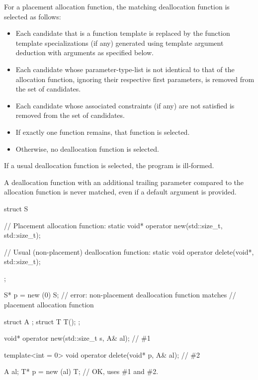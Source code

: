 \pnum
For a placement allocation function,
the matching deallocation function is selected as follows:
\begin{itemize}
\item
Each candidate that is a function template is replaced by
the function template specializations (if any)
generated using template argument deduction
with arguments as specified below.
\item
Each candidate whose parameter-type-list is not identical to
that of the allocation function,
ignoring their respective first parameters,
is removed from the set of candidates.
\item
Each candidate whose associated constraints (if any)
are not satisfied
is removed from the set of candidates.
\item
If exactly one function remains, that function is selected.
\item
Otherwise, no deallocation function is selected.
\end{itemize}
If a usual deallocation function is selected, the program is ill-formed.
\begin{note}
A deallocation function with an additional trailing parameter
compared to the allocation function is never matched,
even if a default argument is provided.
\end{note}

\pnum
\begin{example}
\begin{codeblock}
struct S {
  // Placement allocation function:
  static void* operator new(std::size_t, std::size_t);

  // Usual (non-placement) deallocation function:
  static void operator delete(void*, std::size_t);
};

S* p = new (0) S;   // error: non-placement deallocation function matches
                    // placement allocation function
\end{codeblock}
\end{example}

\begin{example}
\begin{codeblock}
struct A {};
struct T { T(); };

void* operator new(std::size_t s, A& al);       // \#1

template<int = 0>
void operator delete(void* p, A& al);           // \#2

A al;
T* p = new (al) T;                              // OK, uses \#1 and \#2.
\end{codeblock}
\end{example}

